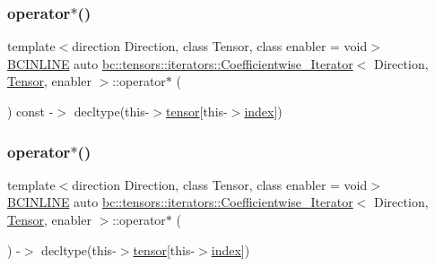 \subsubsection{\texorpdfstring{operator$\ast$()}{operator*()}\hspace{0.1cm}{\footnotesize\ttfamily [1/2]}}
{\footnotesize\ttfamily template$<$direction Direction, class Tensor, class enabler = void$>$ \\
\hyperlink{common_8h_a6699e8b0449da5c0fafb878e59c1d4b1}{B\+C\+I\+N\+L\+I\+NE} auto \hyperlink{structbc_1_1tensors_1_1iterators_1_1Coefficientwise__Iterator}{bc\+::tensors\+::iterators\+::\+Coefficientwise\+\_\+\+Iterator}$<$ Direction, \hyperlink{namespacebc_a659391e47ab612be3ba6c18cf9c89159}{Tensor}, enabler $>$\+::operator$\ast$ (\begin{DoxyParamCaption}{ }\end{DoxyParamCaption}) const -\/$>$ decltype(this-\/$>$\hyperlink{structbc_1_1tensors_1_1iterators_1_1Coefficientwise__Iterator_a57cc6a9c7df0597c90d03309e367cbd2}{tensor}\mbox{[}this-\/$>$\hyperlink{structbc_1_1tensors_1_1iterators_1_1Coefficientwise__Iterator_a746b74f8681813da3829e96e0e9b8273}{index}\mbox{]}) \hspace{0.3cm}{\ttfamily [inline]}}

\mbox{\label{structbc_1_1tensors_1_1iterators_1_1Coefficientwise__Iterator_a38e2d0a36ab0f30cc7e827dbc9977b31}} 
\subsubsection{\texorpdfstring{operator$\ast$()}{operator*()}\hspace{0.1cm}{\footnotesize\ttfamily [2/2]}}
{\footnotesize\ttfamily template$<$direction Direction, class Tensor, class enabler = void$>$ \\
\hyperlink{common_8h_a6699e8b0449da5c0fafb878e59c1d4b1}{B\+C\+I\+N\+L\+I\+NE} auto \hyperlink{structbc_1_1tensors_1_1iterators_1_1Coefficientwise__Iterator}{bc\+::tensors\+::iterators\+::\+Coefficientwise\+\_\+\+Iterator}$<$ Direction, \hyperlink{namespacebc_a659391e47ab612be3ba6c18cf9c89159}{Tensor}, enabler $>$\+::operator$\ast$ (\begin{DoxyParamCaption}{ }\end{DoxyParamCaption}) -\/$>$ decltype(this-\/$>$\hyperlink{structbc_1_1tensors_1_1iterators_1_1Coefficientwise__Iterator_a57cc6a9c7df0597c90d03309e367cbd2}{tensor}\mbox{[}this-\/$>$\hyperlink{structbc_1_1tensors_1_1iterators_1_1Coefficientwise__Iterator_a746b74f8681813da3829e96e0e9b8273}{index}\mbox{]}) \hspace{0.3cm}{\ttfamily [inline]}}


